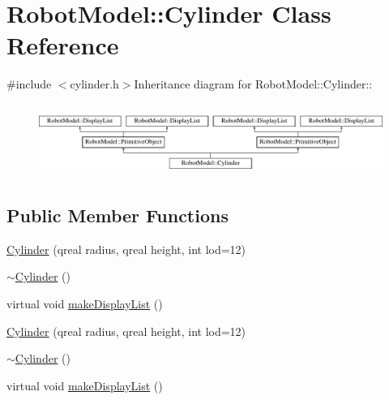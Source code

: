 \hypertarget{class_robot_model_1_1_cylinder}{
\section{RobotModel::Cylinder Class Reference}
\label{class_robot_model_1_1_cylinder}
}


{\ttfamily \#include $<$cylinder.h$>$}Inheritance diagram for RobotModel::Cylinder::\begin{figure}[H]
\begin{center}
\leavevmode
\includegraphics[height=2.35955cm]{class_robot_model_1_1_cylinder}
\end{center}
\end{figure}
\subsection*{Public Member Functions}
\begin{DoxyCompactItemize}
\item 
\hyperlink{class_robot_model_1_1_cylinder_aa738cca8df1e6a449662f33a814e67f8}{Cylinder} (qreal radius, qreal height, int lod=12)
\item 
\hyperlink{class_robot_model_1_1_cylinder_a05ab556f0ae3cd6e99d9d1f3caca80b3}{$\sim$Cylinder} ()
\item 
virtual void \hyperlink{class_robot_model_1_1_cylinder_a9f0361117d5f20344f543c9e20df1113}{makeDisplayList} ()
\item 
\hyperlink{class_robot_model_1_1_cylinder_a16c419bccd55814a38877eeb9b10f3c0}{Cylinder} (qreal radius, qreal height, int lod=12)
\item 
\hyperlink{class_robot_model_1_1_cylinder_a18a0f743261694851bdbc50339f423f2}{$\sim$Cylinder} ()
\item 
virtual void \hyperlink{class_robot_model_1_1_cylinder_a92e328e0a01f4fd787d73d4996d67b0a}{makeDisplayList} ()
\end{DoxyCompactItemize}


